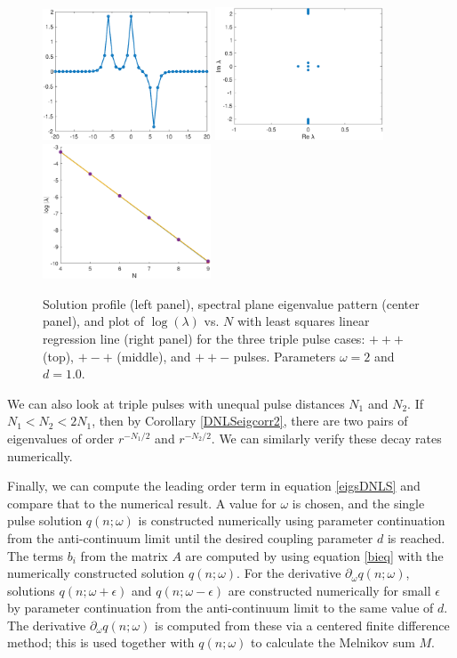 \documentclass[12pt]{elsarticle}
\begin{document}
\begin{figure}[H]
\includegraphics[width=5cm]{dnlsPPM.eps}
\includegraphics[width=5cm]{dnlsPPMeig.eps}
\includegraphics[width=5cm]{dnlsPPMdecay.eps}
\caption{Solution profile (left panel), spectral plane eigenvalue pattern (center panel), and plot of $\log(\lambda)$ vs. $N$ with least squares linear regression line (right panel) for the three triple pulse cases: $+++$ (top), $+-+$ (middle), and $++-$ pulses. Parameters $\omega = 2$ and $d = 1.0$.}
\label{fig:eigendecay2}
\end{figure}

We can also look at triple pulses with unequal pulse distances $N_1$ and $N_2$. If $N_1 < N_2 < 2 N_1$, then by Corollary \ref{DNLSeigcorr2}, there are two pairs of eigenvalues of order $r^{-N_1/2}$ and $r^{-N_2/2}$. We can similarly verify these decay rates numerically.

Finally, we can compute the leading order term in equation \eqref{eigsDNLS} and compare that to the numerical result. A value for $\omega$ is chosen, and the single pulse solution $q(n; \omega)$ is constructed numerically using parameter continuation from the anti-continuum limit until the desired coupling parameter $d$ is reached. The terms $b_i$ from the matrix $A$ are computed by using equation \eqref{bieq} with the numerically constructed solution $q(n; \omega)$. For the derivative $\partial_\omega q(n; \omega)$, solutions $q(n; \omega + \epsilon)$ and $q(n; \omega - \epsilon)$ are constructed numerically for small $\epsilon$ by parameter continuation from the anti-continuum limit to the same value of $d$. The derivative $\partial_\omega q(n; \omega)$ is computed from these via a centered finite difference method; this is used together with $q(n; \omega)$ to calculate the Melnikov sum $M$. 
\end{document}
